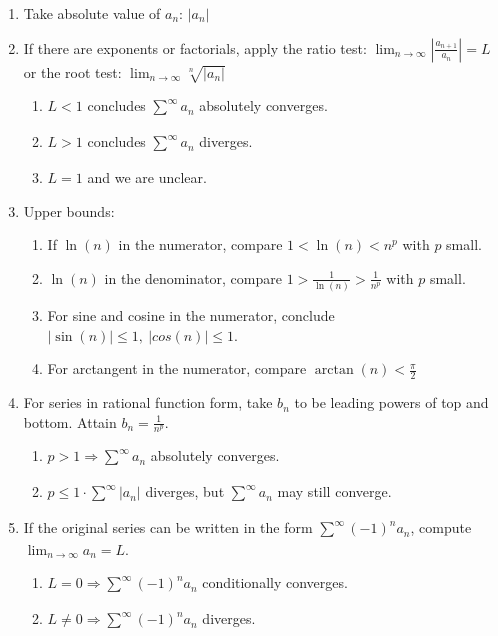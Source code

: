 \documentclass[12pt]{article}
\theoremstyle{plain}
\theoremstyle{remark}
\theoremstyle{definition}
\begin{document}
\begin{enumerate}
\def\labelenumi{\arabic{enumi}.}
\item
  Take absolute value of \(a_{n}\): \(\left| a_{n} \right|\)
\item
  If there are exponents or factorials, apply the ratio test:
  \(\lim_{n \rightarrow \infty}\left| \frac{a_{n + 1}}{a_{n}} \right| = L\)
  or the root test:
  \(\lim_{n \rightarrow \infty}\sqrt[n]{\left| a_{n} \right|}\)

  \begin{enumerate}
  \def\labelenumii{\alph{enumii}.}
  \item
    \(L < 1\) concludes \(\sum_{}^{\infty}a_{n}\) absolutely converges.
  \item
    \(L > 1\) concludes \(\sum_{}^{\infty}a_{n}\) diverges.
  \item
    \(L = 1\) and we are unclear.
  \end{enumerate}
\item
  Upper bounds:

  \begin{enumerate}
  \def\labelenumii{\alph{enumii}.}
  \item
    If \(\ln(n)\) in the numerator, compare \(1 < \ln(n) < n^{p}\) with
    \(p\) small.
  \item
    \(\ln(n)\) in the denominator, compare
    \(1 > \frac{1}{\ln(n)} > \frac{1}{n^{p}}\) with \(p\) small.
  \item
    For sine and cosine in the numerator, conclude
    \(\left| \sin(n) \right| \leq 1,\ |cos(n)| \leq 1\).
  \item
    For arctangent in the numerator, compare
    \(\arctan(n) < \frac{\pi}{2}\)
  \end{enumerate}
\item
  For series in rational function form, take \(b_{n}\) to be leading
  powers of top and bottom. Attain \(b_{n} = \frac{1}{n^{p}}\).

  \begin{enumerate}
  \def\labelenumii{\alph{enumii}.}
  \item
    \(p > 1 \Rightarrow \sum_{}^{\infty}a_{n}\) absolutely converges.
  \item
    \(p \leq 1 \cdot \sum_{}^{\infty}{|a_{n}|}\) diverges, but
    \(\sum_{}^{\infty}a_{n}\) may still converge.
  \end{enumerate}
\item
  If the original series can be written in the form
  \(\sum_{}^{\infty}{( - 1)^{n}a_{n}}\), compute
  \(\lim_{n \rightarrow \infty}a_{n} = L\).

  \begin{enumerate}
  \def\labelenumii{\alph{enumii}.}
  \item
    \(L = 0 \Rightarrow \sum_{}^{\infty}{( - 1)^{n}a_{n}}\)
    conditionally converges.
  \item
    \(L \neq 0 \Rightarrow \sum_{}^{\infty}{( - 1)^{n}a_{n}}\) diverges.
  \end{enumerate}
\end{enumerate}
\end{document}
